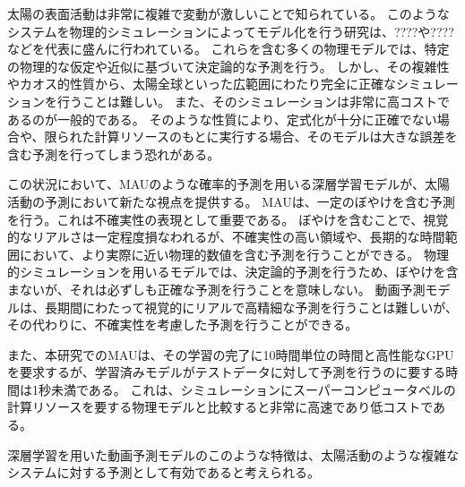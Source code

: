       太陽の表面活動は非常に複雑で変動が激しいことで知られている。
      このようなシステムを物理的シミュレーションによってモデル化を行う研究は、????や????などを代表に盛んに行われている。
      これらを含む多くの物理モデルでは、特定の物理的な仮定や近似に基づいて決定論的な予測を行う。
      しかし、その複雑性やカオス的性質から、太陽全球といった広範囲にわたり完全に正確なシミュレーションを行うことは難しい。
      また、そのシミュレーションは非常に高コストであるのが一般的である。
      そのような性質により、定式化が十分に正確でない場合や、限られた計算リソースのもとに実行する場合、そのモデルは大きな誤差を含む予測を行ってしまう恐れがある。

      この状況において、MAUのような確率的予測を用いる深層学習モデルが、太陽活動の予測において新たな視点を提供する。
      MAUは、一定のぼやけを含む予測を行う。これは不確実性の表現として重要である。
      ぼやけを含むことで、視覚的なリアルさは一定程度損なわれるが、不確実性の高い領域や、長期的な時間範囲において、より実際に近い物理的数値を含む予測を行うことができる。
      物理的シミュレーションを用いるモデルでは、決定論的予測を行うため、ぼやけを含まないが、それは必ずしも正確な予測を行うことを意味しない。
      動画予測モデルは、長期間にわたって視覚的にリアルで高精細な予測を行うことは難しいが、その代わりに、不確実性を考慮した予測を行うことができる。
      
      また、本研究でのMAUは、その学習の完了に10時間単位の時間と高性能なGPUを要求するが、学習済みモデルがテストデータに対して予測を行うのに要する時間は1秒未満である。
      これは、シミュレーションにスーパーコンピュータベルの計算リソースを要する物理モデルと比較すると非常に高速であり低コストである。

      深層学習を用いた動画予測モデルのこのような特徴は、太陽活動のような複雑なシステムに対する予測として有効であると考えられる。
  


